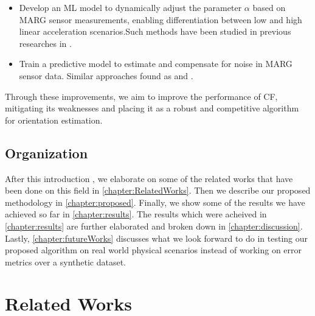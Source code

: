 \documentclass{iutbscthesis}
\begin{document}
\begin{itemize}
    \item Develop an ML model to dynamically adjust the parameter $\alpha$ based on MARG sensor measurements, enabling differentiation between low and high linear acceleration scenarios.Such methods have been studied in previous researches in \cite{vertzberger2022adaptive}.
    \item Train a predictive model to estimate and compensate for noise in MARG sensor data. Similar approaches found as \cite{denoising} and \cite{noiseremoval2}.
\end{itemize}

Through these improvements, we aim to improve the performance of CF, mitigating its weaknesses and placing it as a robust and competitive algorithm for orientation estimation.


\section{Organization}

After this introduction , we elaborate on some of the related 
works 
that have been done on this field in \autoref{chapter:RelatedWorks}. 
Then we describe our proposed methodology in \autoref{chapter:proposed}. 
Finally, we show some of the results we have achieved so far 
in \autoref{chapter:results}. The results which were acheived in \autoref{chapter:results}
are further elaborated and broken down in \autoref{chapter:discussion}. Lastly,
\autoref{chapter:futureWorks} discusses what we look forward to do in testing our
proposed algorithm on real world physical scenarios instead of working on error
metrics over a synthetic dataset.




\chapter{Related Works} \label{chapter:RelatedWorks}
\end{document}
